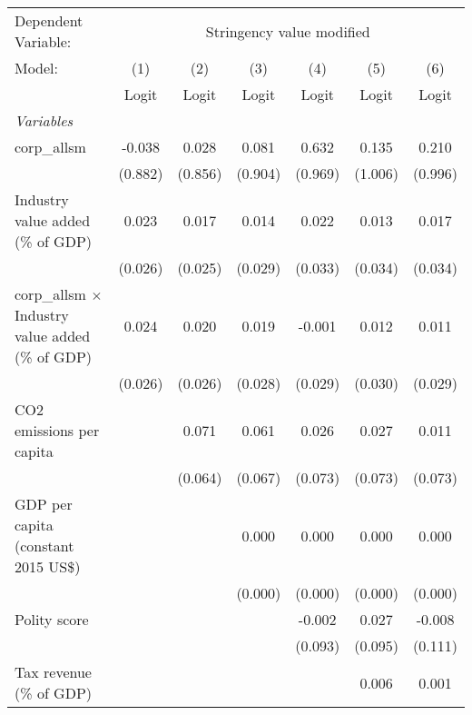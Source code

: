 
\begingroup
\centering
\begin{tabular}{lcccccc}
   \toprule
   Dependent Variable: & \multicolumn{6}{c}{Stringency value modified}\\
   Model:                                                   & (1)     & (2)     & (3)     & (4)     & (5)     & (6)\\  
                                                            &  Logit  & Logit   & Logit   & Logit   & Logit   & Logit\\  
   \midrule
   \emph{Variables}\\
   corp\_allsm                                              & -0.038  & 0.028   & 0.081   & 0.632   & 0.135   & 0.210\\   
                                                            & (0.882) & (0.856) & (0.904) & (0.969) & (1.006) & (0.996)\\   
   Industry value added (\% of GDP)                         & 0.023   & 0.017   & 0.014   & 0.022   & 0.013   & 0.017\\   
                                                            & (0.026) & (0.025) & (0.029) & (0.033) & (0.034) & (0.034)\\   
   corp\_allsm $\times$ Industry value added (\% of GDP)    & 0.024   & 0.020   & 0.019   & -0.001  & 0.012   & 0.011\\   
                                                            & (0.026) & (0.026) & (0.028) & (0.029) & (0.030) & (0.029)\\   
   CO2 emissions per capita                                 &         & 0.071   & 0.061   & 0.026   & 0.027   & 0.011\\   
                                                            &         & (0.064) & (0.067) & (0.073) & (0.073) & (0.073)\\   
   GDP per capita (constant 2015 US\$)                      &         &         & 0.000   & 0.000   & 0.000   & 0.000\\   
                                                            &         &         & (0.000) & (0.000) & (0.000) & (0.000)\\   
   Polity score                                             &         &         &         & -0.002  & 0.027   & -0.008\\   
                                                            &         &         &         & (0.093) & (0.095) & (0.111)\\   
   Tax revenue (\% of GDP)                                  &         &         &         &         & 0.006   & 0.001\\   

\end{tabular}
